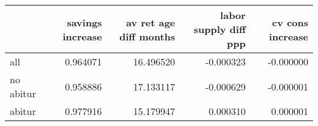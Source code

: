 \begin{tabular}{lrrrr}
\toprule
 & savings increase & av ret age diff months & labor supply diff ppp & cv cons increase \\
\midrule
all & 0.964071 & 16.496520 & -0.000323 & -0.000000 \\
no abitur & 0.958886 & 17.133117 & -0.000629 & -0.000001 \\
abitur & 0.977916 & 15.179947 & 0.000310 & 0.000001 \\
\bottomrule
\end{tabular}
